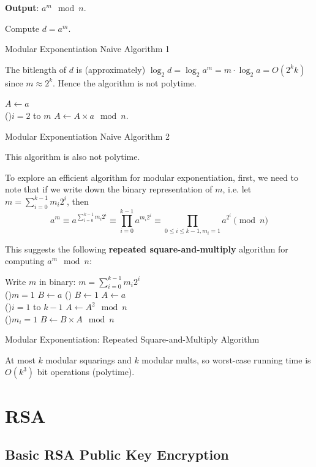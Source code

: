 \documentclass[12pt,titlepage]{article}
\let\stdsection\section
\renewcommand\section{\clearpage\stdsection}
\begin{document}
\textbf{Output}: $a^m \mod n$.

\begin{algorithm}
	Compute $d = a^m$.\\
	\caption {Modular Exponentiation Naive Algorithm 1}
\end{algorithm}

The bitlength of $d$ is (approximately) $\log_2 d = \log_2 a^m = m \cdot \log_2 a = O(2^k k)$ since $m \approx 2^k$. Hence the algorithm is not polytime.

\begin{algorithm}
	$A \leftarrow a$\\
	\For(){$i = 2$ to $m$}{
		$A \leftarrow A \times a \mod n$.
	}
	\caption {Modular Exponentiation Naive Algorithm 2}
\end{algorithm}

This algorithm is also not polytime.

To explore an efficient algorithm for modular exponentiation, first, we need to note that if we write down the binary representation of $m$, i.e. let $m = \sum_{i=0}^{k-1}m_i2^i$, then $$a^m \equiv a^{\sum_{i=0}^{k-1}m_i2^i} \equiv \prod_{i=0}^{k-1}a^{m_i2^i} \equiv \prod_{0 \leq i \leq k-1, m_i = 1}a^{2^i} \pmod n$$

This suggests the following \textbf{repeated square-and-multiply} algorithm for computing $a^m \mod n$:
\newpage
\begin{algorithm}
	Write $m$ in binary: $m = \sum_{i=0}^{k-1}m_i2^i$\\
	\If(){$m = 1$}{
		$B \leftarrow a$
	}\Else(){
		$B \leftarrow 1$
	}
	$A \leftarrow a$\\
	\For(){$i = 1$ to $k-1$}{
		$A \leftarrow A^2 \mod n$\\
		\If(){$m_i = 1$}{
			$B \leftarrow B \times A \mod n$
		}
	}
	\caption{Modular Exponentiation: Repeated Square-and-Multiply Algorithm}
\end{algorithm}
At most $k$ modular squarings and $k$ modular mults, so worst-case running time is $O(k^3)$ bit operations (polytime).

\section{RSA}
\subsection{Basic RSA Public Key Encryption}
\end{document}
